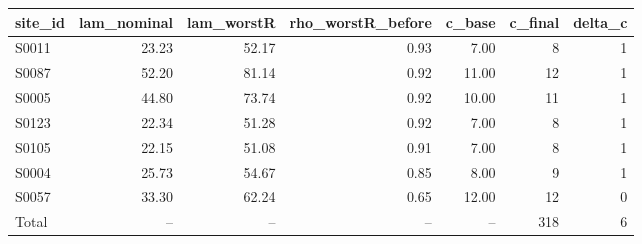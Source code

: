 \begin{tabular}{lrrrrrr}
\toprule
site\_id & lam\_nominal & lam\_worstR & rho\_worstR\_before & c\_base & c\_final & delta\_c \\
\midrule
S0011 & 23.23 & 52.17 & 0.93 & 7.00 & 8 & 1 \\
S0087 & 52.20 & 81.14 & 0.92 & 11.00 & 12 & 1 \\
S0005 & 44.80 & 73.74 & 0.92 & 10.00 & 11 & 1 \\
S0123 & 22.34 & 51.28 & 0.92 & 7.00 & 8 & 1 \\
S0105 & 22.15 & 51.08 & 0.91 & 7.00 & 8 & 1 \\
S0004 & 25.73 & 54.67 & 0.85 & 8.00 & 9 & 1 \\
S0057 & 33.30 & 62.24 & 0.65 & 12.00 & 12 & 0 \\
Total & -- & -- & -- & -- & 318 & 6 \\
\bottomrule
\end{tabular}
